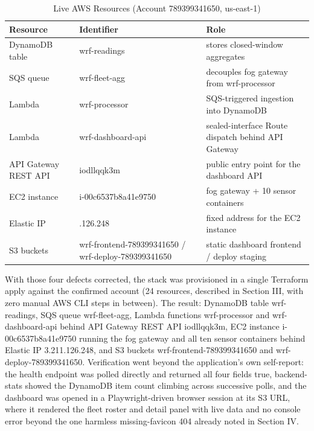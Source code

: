 \documentclass[conference]{IEEEtran}
\begin{document}
\begin{table}[!t]
\caption{Live AWS Resources (Account 789399341650, us-east-1)}
\label{tab:resources}
\centering
\footnotesize
\begin{tabular}{|>{\raggedright\arraybackslash}p{1.7cm}|>{\raggedright\arraybackslash}p{2.9cm}|>{\raggedright\arraybackslash}p{2.6cm}|}
\hline
\textbf{Resource} & \textbf{Identifier} & \textbf{Role} \\
\hline
DynamoDB table & wrf-readings & stores closed-window aggregates \\
\hline
SQS queue & wrf-fleet-agg & decouples fog gateway from wrf-processor \\
\hline
Lambda & wrf-processor & SQS-triggered ingestion into DynamoDB \\
\hline
Lambda & wrf-dashboard-api & sealed-interface Route dispatch behind API Gateway \\
\hline
API Gateway REST API & iodllqqk3m & public entry point for the dashboard API \\
\hline
EC2 instance & i-00c6537b8a41e9750 & fog gateway + 10 sensor containers \\
\hline
Elastic IP & 3.211.126.248 & fixed address for the EC2 instance \\
\hline
S3 buckets & wrf-frontend-789399341650 / wrf-deploy-789399341650 & static dashboard frontend / deploy staging \\
\hline
\end{tabular}
\end{table}

With those four defects corrected, the stack was provisioned in a single Terraform apply against the confirmed account (24 resources, described in Section III, with zero manual AWS CLI steps in between). The result: DynamoDB table wrf-readings, SQS queue wrf-fleet-agg, Lambda functions wrf-processor and wrf-dashboard-api behind API Gateway REST API iodllqqk3m, EC2 instance i-00c6537b8a41e9750 running the fog gateway and all ten sensor containers behind Elastic IP 3.211.126.248, and S3 buckets wrf-frontend-789399341650 and wrf-deploy-789399341650. Verification went beyond the application's own self-report: the health endpoint was polled directly and returned all four fields true, backend-stats showed the DynamoDB item count climbing across successive polls, and the dashboard was opened in a Playwright-driven browser session at its S3 URL, where it rendered the fleet roster and detail panel with live data and no console error beyond the one harmless missing-favicon 404 already noted in Section IV.
\end{document}
